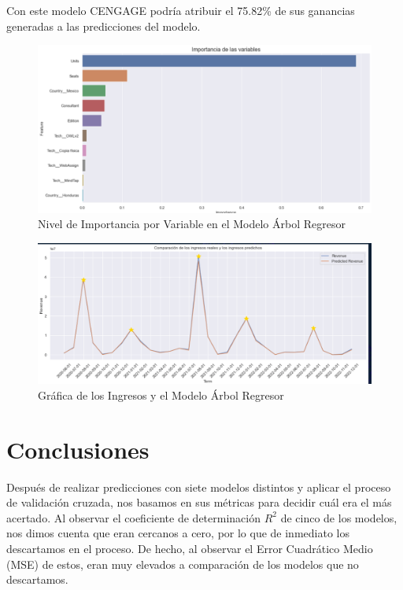 \documentclass{article}
\begin{document}
        Con este modelo CENGAGE podría atribuir el 75.82\% de sus ganancias generadas a las predicciones del modelo.
        
        \begin{figure}[h]
            \centering
            \includegraphics[width=\columnwidth]{importance.png}
            \caption{Nivel de Importancia por Variable en el Modelo Árbol Regresor}
            \label{fig:importance}
        \end{figure}
        
        \begin{figure}
            \centering
            \includegraphics[width = \columnwidth]{model.png}
            \caption{Gráfica de los Ingresos y el Modelo Árbol Regresor}
            \label{fig:model}
        \end{figure}

    \section{Conclusiones}
        Después de realizar predicciones con siete modelos distintos y aplicar el proceso de validación cruzada, nos basamos en sus métricas para decidir cuál era el más acertado. Al observar el coeficiente de determinación $R^{2}$ de cinco de los modelos, nos dimos cuenta que eran cercanos a cero, por lo que de inmediato los descartamos en el proceso. De hecho, al observar el Error Cuadrático Medio (MSE) de estos, eran muy elevados a comparación de los modelos que no descartamos.
        
\end{document}
